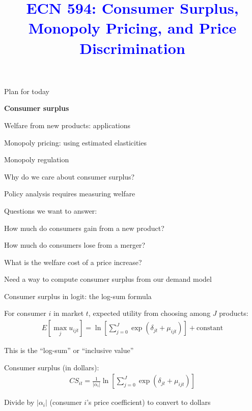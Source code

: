 \documentclass[notes,11pt, aspectratio=169]{beamer}
\title[]{\textcolor{blue}{ECN 594: Consumer Surplus, Monopoly Pricing, and Price Discrimination}}
\author[PGP]{}
\institute[FRBNY]{\small{\begin{tabular}{c c c}
Nicholas Vreugdenhil \\
\end{tabular}}}
\date{}
\newenvironment{wideitemize}{\itemize\addtolength{\itemsep}{10pt}}{\enditemize}
\newenvironment{wideenumerate}{\enumerate\addtolength{\itemsep}{10pt}}{\endenumerate}
\begin{document}
\begin{frame}
\maketitle
  \centering
\end{frame}

\begin{frame}{Plan for today}
  \begin{wideenumerate}
    \item \textbf{Consumer surplus}
    \item Welfare from new products: applications
    \item Monopoly pricing: using estimated elasticities
    \item Monopoly regulation
  \end{wideenumerate}
\end{frame}


\begin{frame}{Why do we care about consumer surplus?}
	\begin{wideitemize}
		\item Policy analysis requires measuring welfare
		\item Questions we want to answer:
		\begin{wideitemize}
			\vspace{5pt}
			\item How much do consumers gain from a new product?
			\item How much do consumers lose from a merger?
			\item What is the welfare cost of a price increase?
		\end{wideitemize}
		\item Need a way to compute consumer surplus from our demand model
	\end{wideitemize}
\end{frame}

\begin{frame}{Consumer surplus in logit: the log-sum formula}
	\begin{wideitemize}
		\item For consumer $i$ in market $t$, expected utility from choosing among $J$ products:
		\begin{align*}
			E[\max_j u_{ijt}] = \ln\left[\sum_{j=0}^J \exp(\delta_{jt} + \mu_{ijt})\right] + \text{constant}
		\end{align*}
		\item This is the ``log-sum'' or ``inclusive value''
		\item Consumer surplus (in dollars):
		\begin{align*}
			CS_{it} = \frac{1}{|\alpha_i|} \ln\left[\sum_{j=0}^J \exp(\delta_{jt} + \mu_{ijt})\right]
		\end{align*}
		\item Divide by $|\alpha_i|$ (consumer $i$'s price coefficient) to convert to dollars
	\end{wideitemize}
\end{frame}
\end{document}

